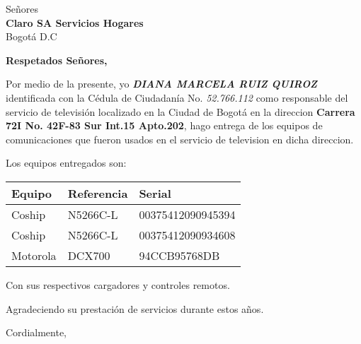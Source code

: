 \documentclass[12pt]{letter} %
\date{Marzo 16, 2019}
\begin{document}

\begin{letter}{Señores \\ \textbf{Claro SA Servicios Hogares}  \\ Bogotá D.C} %


\opening{\textbf{Respetados Señores,}}

Por medio de la presente, yo \textbf{\emph{DIANA MARCELA RUIZ QUIROZ}} identificada con la Cédula de Ciudadanía No. \emph{52.766.112} como
responsable del servicio de televisión localizado en la Ciudad de Bogotá en la direccion \textbf{Carrera 72I No. 42F-83 Sur Int.15 Apto.202}, 
hago entrega de los equipos de comunicaciones que fueron usados en el servicio de television en dicha direccion.

Los equipos entregados son:

    \begin{tabular}{|l|l|l|}
        \hline
        Equipo   & Referencia & Serial            \\ \hline
        Coship   & N5266C-L   & 00375412090945394 \\ \hline
        Coship   & N5266C-L   & 00375412090934608 \\ \hline
        Motorola & DCX700     & 94CCB95768DB      \\ \hline
    \end{tabular}

Con sus respectivos cargadores y controles remotos.

Agradeciendo su prestación de servicios durante estos años.

\vspace{2\parskip} %
\closing{Cordialmente,}
\vspace{2\parskip} %




\end{letter}
 
\end{document}
